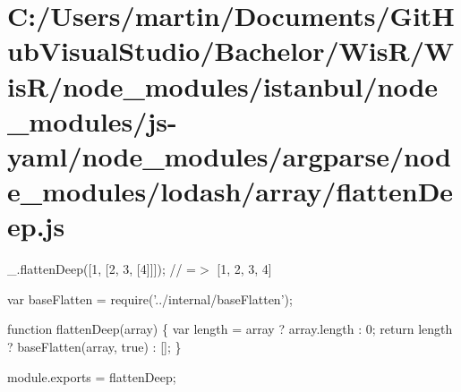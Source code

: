 \hypertarget{_c_1_2_users_2martin_2_documents_2_git_hub_visual_studio_2_bachelor_2_wis_r_2_wis_r_2node_module3e59e70229684c451d857477f17417d2}{}\section{C\+:/\+Users/martin/\+Documents/\+Git\+Hub\+Visual\+Studio/\+Bachelor/\+Wis\+R/\+Wis\+R/node\+\_\+modules/istanbul/node\+\_\+modules/js-\/yaml/node\+\_\+modules/argparse/node\+\_\+modules/lodash/array/flatten\+Deep.\+js}
\+\_\+.\+flatten\+Deep(\mbox{[}1, \mbox{[}2, 3, \mbox{[}4\mbox{]}\mbox{]}\mbox{]}); // =$>$ \mbox{[}1, 2, 3, 4\mbox{]}


\begin{DoxyCodeInclude}
var baseFlatten = require(\textcolor{stringliteral}{'../internal/baseFlatten'});

\textcolor{keyword}{function} flattenDeep(array) \{
  var length = array ? array.length : 0;
  \textcolor{keywordflow}{return} length ? baseFlatten(array, \textcolor{keyword}{true}) : [];
\}

module.exports = flattenDeep;
\end{DoxyCodeInclude}
 